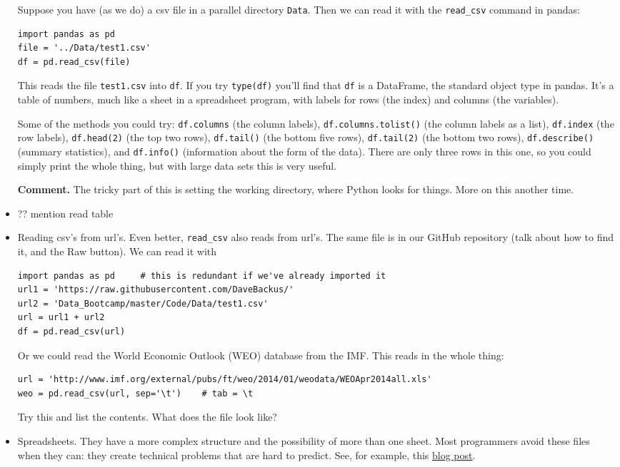 \documentclass[11pt]{article}
\begin{document}
\begin{itemize}
Suppose you have (as we do) a csv file in a parallel directory {\tt Data}.
Then we can read it with the \verb:read_csv: command in pandas:
\begin{verbatim}
import pandas as pd
file = '../Data/test1.csv'
df = pd.read_csv(file)
\end{verbatim}
This reads the file {\tt test1.csv} into {\tt df}.
If you try {\tt type(df)} you'll find that {\tt df} is a DataFrame,
the standard object type in pandas.
It's a table of numbers, much like a sheet in a spreadsheet program,
with labels for rows (the index) and columns (the variables).

Some of the methods you could try:
{\tt df.columns} (the column labels),
{\tt df.columns.tolist()} (the column labels as a list),
{\tt df.index} (the row labels),
{\tt df.head(2)} (the top two rows),
{\tt df.tail()} (the bottom five rows),
{\tt df.tail(2)} (the bottom two rows),
{\tt df.describe()} (summary statistics),
and {\tt df.info()} (information about the form of the data).
There are only three rows in this one, so you could simply
print the whole thing, but with large data sets this is very useful.

{\bf Comment.}
The tricky part of this is setting the working directory,
where Python looks for things.
More on this another time.


\item ?? mention {read table}

\item Reading csv's from url's.
Even better, {\tt read\_csv} also reads from url's.
The same file is in our GitHub repository (talk about how to find it,
and the Raw button).
We can read it with
\begin{verbatim}
import pandas as pd     # this is redundant if we've already imported it
url1 = 'https://raw.githubusercontent.com/DaveBackus/'
url2 = 'Data_Bootcamp/master/Code/Data/test1.csv'
url = url1 + url2
df = pd.read_csv(url)
\end{verbatim}
Or we could read the World Economic Outlook (WEO) database from the IMF.
This reads in the whole thing:
\begin{verbatim}
url = 'http://www.imf.org/external/pubs/ft/weo/2014/01/weodata/WEOApr2014all.xls'
weo = pd.read_csv(url, sep='\t')    # tab = \t
\end{verbatim}
Try this and list the contents.
What does the file look like?

\item Spreadsheets.  They have a more complex structure and the possibility
of more than one sheet.
Most programmers avoid these files when they can:  they create technical problems
that are hard to predict.
See, for example, this
\href{http://www.win-vector.com/blog/2014/11/excel-spreadsheets-are-hard-to-get-right/}{blog post}.


\end{itemize}
\end{document}
